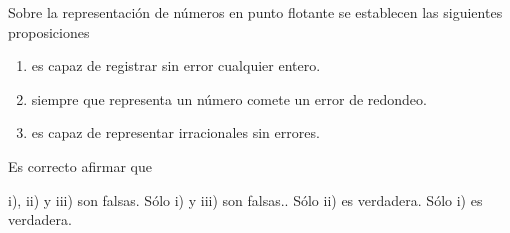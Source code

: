 \begin{pregunta}
\begin{cuerpo}
Sobre la representación de números en punto flotante se establecen las siguientes proposiciones
\begin{enumerate}
\item[i)] es capaz de registrar sin error cualquier entero.
\item[ii)] siempre que representa un número comete un error de redondeo.
\item[iii)] es capaz de representar irracionales sin errores.
\end{enumerate}
Es correcto afirmar que
\end{cuerpo}
\begin{multicols}{2}
\begin{alternativas}
{i), ii) y iii) son falsas.} %
{Sólo i) y iii) son falsas..}
{Sólo ii) es verdadera.}
{Sólo i) es verdadera.}
\end{alternativas}
\end{multicols}
\justificacion{0cm}
\end{pregunta}